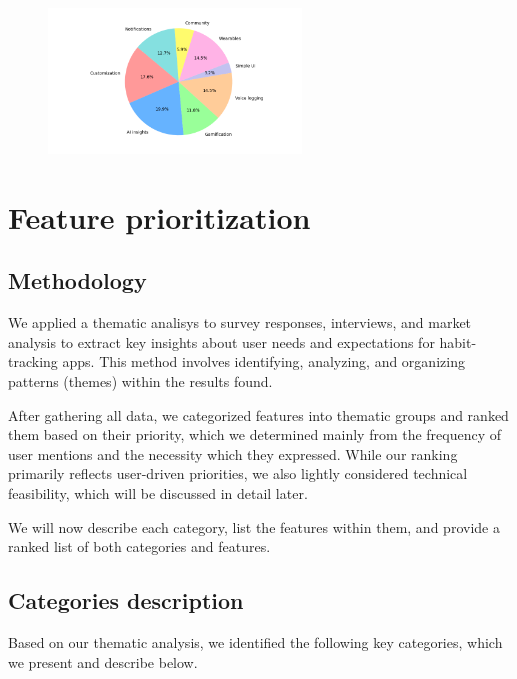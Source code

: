 \documentclass{article}
\begin{document}
\begin{figure}[H]
    \centering
    \includegraphics[width=0.6\textwidth]{images/user-aspects.png}
\end{figure}

\section{Feature prioritization}

\subsection{Methodology}

We applied a thematic analisys to survey responses, interviews, and market analysis to extract key insights about user needs and expectations for habit-tracking apps.
This method involves identifying, analyzing, and organizing patterns (themes) within the results found.

After gathering all data, we categorized features into thematic groups and ranked them based on their priority, which we determined mainly from the frequency of user mentions and the necessity which they expressed.
While our ranking primarily reflects user-driven priorities, we also lightly considered technical feasibility, which will be discussed in detail later.

We will now describe each category, list the features within them, and provide a ranked list of both categories and features.

\subsection{Categories description}

Based on our thematic analysis, we identified the following key categories, which we present and describe below.
\end{document}
